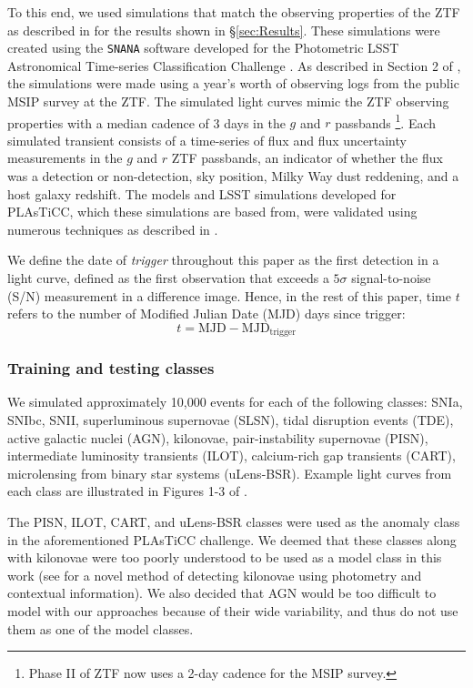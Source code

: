 \documentclass[fleqn,usenatbib]{mnras}
\begin{document}
To this end, we used simulations that match the observing properties of the ZTF as described in \citet{Muthukrishna19RAPID} for the results shown in \S\ref{sec:Results}. These simulations were created using the \texttt{SNANA} \citep{Kessler2010SNANA:Analysis} software developed for the Photometric LSST Astronomical Time-series Classification Challenge \citep[PLAsTiCC, ][]{plasticcNote, KesslerPlasticcModels}. As described in Section 2 of \citealt{Muthukrishna19RAPID}, the simulations were made using a year's worth of observing logs from the public MSIP survey at the ZTF. The simulated light curves mimic the ZTF observing properties with a median cadence of 3 days in the $g$ and $r$ passbands \footnote{Phase II of ZTF now uses a 2-day cadence for the MSIP survey.}. Each simulated transient consists of a time-series of flux and flux uncertainty measurements in the $g$ and $r$ ZTF passbands, an indicator of whether the flux was a detection or non-detection, sky position, Milky Way dust reddening, and a host galaxy redshift. The models and LSST simulations developed for PLAsTiCC, which these simulations are based from, were validated using numerous techniques as described in \citet{Hlozek2020PLAsTiCCResults}. 

We define the date of \textit{trigger} throughout this paper as the first detection in a light curve, defined as the first observation that exceeds a $5\sigma$ signal-to-noise (S/N) measurement in a difference image. Hence, in the rest of this paper, time $t$ refers to the number of Modified Julian Date (MJD) days since trigger:
\begin{equation}
    t = \mathrm{MJD} - \mathrm{MJD}_{\mathrm{trigger}}
\end{equation}



\subsubsection{Training and testing classes}
We simulated approximately 10,000 events for each of the following classes: SNIa, SNIbc, SNII, superluminous supernovae (SLSN), tidal disruption events (TDE), active galactic nuclei (AGN), kilonovae, pair-instability supernovae (PISN), intermediate luminosity transients (ILOT), calcium-rich gap transients (CART), microlensing from binary star systems (uLens-BSR). Example light curves from each class are illustrated in Figures 1-3 of \citealt{KesslerPlasticcModels}. 

The PISN, ILOT, CART, and uLens-BSR classes were used as the anomaly class in the aforementioned PLAsTiCC challenge. We deemed that these classes along with kilonovae were too poorly understood to be used as a model class in this work (see \citet{Chatterjee2021} for a novel method of detecting kilonovae using photometry and contextual information). We also decided that AGN would be too difficult to model with our approaches because of their wide variability, and thus do not use them as one of the model classes. 
\end{document}

